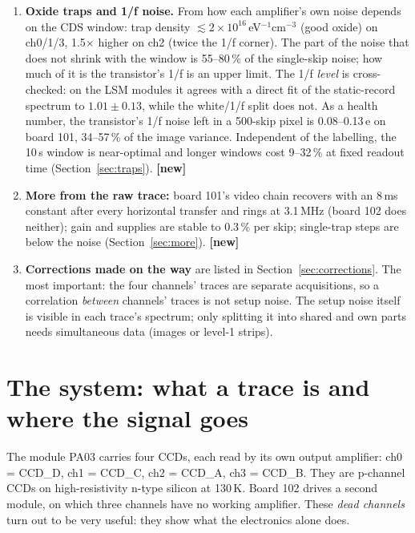 \documentclass[11pt]{article}
\newcommand{\novel}{\textcolor{blue!60!black}{\textbf{[new]}}}
\begin{document}
\begin{enumerate}
  serial registers, not in the amplifiers (Section~\ref{sec:images}).
\item \textbf{Oxide traps and 1/f noise.} From how each amplifier's own noise depends on the CDS window: trap density
  $\lesssim2\times10^{16}$\,eV$^{-1}$cm$^{-3}$ (good oxide) on ch0/1/3, 1.5$\times$ higher on ch2 (twice the 1/f corner).
  The part of the noise that does not shrink with the window is 55--80\,\% of the single-skip noise; how much of it is
  the transistor's 1/f is an upper limit. The 1/f \emph{level} is cross-checked: on the LSM modules it agrees with a
  direct fit of the static-record spectrum to $1.01\pm0.13$, while the white/1/f split does not. As a health number, the
  transistor's 1/f noise left in a 500-skip pixel is 0.08--0.13\,e on board 101, 34--57\,\% of the image variance.
  Independent of the labelling, the 10\,\textmu s window is near-optimal and longer windows cost 9--32\,\% at fixed readout time
  (Section~\ref{sec:traps}). \novel
\item \textbf{More from the raw trace:} board 101's video chain recovers with an 8\,ms constant after every
  horizontal transfer and rings at 3.1\,MHz (board 102 does neither); gain and supplies are stable to 0.3\,\% per skip;
  single-trap steps are below the noise (Section~\ref{sec:more}). \novel
\item \textbf{Corrections made on the way} are listed in Section~\ref{sec:corrections}. The most important: the four
  channels' traces are separate acquisitions, so a correlation \emph{between} channels' traces is not setup noise. The
  setup noise itself is visible in each trace's spectrum; only splitting it into shared and own parts needs simultaneous
  data (images or level-1 strips).
\end{enumerate}

\section{The system: what a trace is and where the signal goes}\label{sec:system}
The module PA03 carries four CCDs, each read by its own output amplifier: ch0 = CCD\_D, ch1 = CCD\_C, ch2 = CCD\_A,
ch3 = CCD\_B. They are p-channel CCDs on high-resistivity n-type silicon at 130\,K. Board 102 drives a second module, on
which three channels have no working amplifier. These \emph{dead channels} turn out to be very useful: they show what
the electronics alone does.
\end{document}
